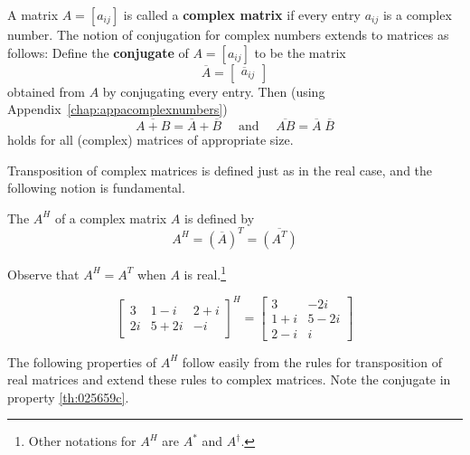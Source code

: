 \documentclass{ximera}
\begin{document}
A matrix $A = \left[ a_{ij} \right]$ is called a \textbf{complex matrix} if every entry $a_{ij}$ is a complex number. The notion of conjugation for complex numbers extends to matrices as follows: Define the \textbf{conjugate} of $A = \left[ a_{ij} \right]$ to be the matrix
\begin{equation*}
\overline{A} = \left[ \begin{array}{c} \overline{a}_{ij} \end{array}\right]
\end{equation*}
obtained from $A$ by conjugating every entry. Then (using Appendix~\ref{chap:appacomplexnumbers})
\begin{equation*}
\overline{A + B} = \overline{A} + \overline{B} \quad \mbox{ and } \quad \overline{AB} = \overline{A} \; \overline{B}
\end{equation*}
holds for all (complex) matrices of appropriate size.

Transposition of complex matrices is defined just as in the real case, and the following notion is fundamental.


\begin{definition}\label{dfn:conjtrans}
The  $A^{H}$ of a complex matrix $A$ is defined by
\begin{equation*}
A^H = (\overline{A})^T = \overline{(A^T)}
\end{equation*}
\end{definition}

\noindent Observe that $A^{H} = A^{T}$ when $A$ is real.\footnote{Other notations for $A^{H}$ are $A^\ast$ and $A^\dagger$.}

\begin{example}\label{ex:025654}
\begin{equation*}
\left[ \begin{array}{ccr}
3 & 1 - i & 2 + i \\
2i & 5 + 2i & -i
\end{array}\right]^H = \left[ \begin{array}{cc}
3 & -2i \\
1 + i & 5 - 2i \\
2 - i & i
\end{array}\right]
\end{equation*}
\end{example}

The following properties of $A^{H}$ follow easily from the rules for transposition of real matrices and extend these rules to complex matrices. Note the conjugate in property \ref{th:025659c}.
\end{document}
